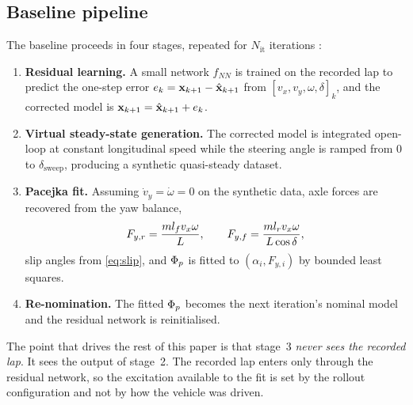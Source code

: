 \subsection{Baseline pipeline}
\label{subsec:baseline}

The baseline proceeds in four stages, repeated for $N_{\mathrm{it}}$
iterations \cite{ontrack2025}:

\begin{enumerate}
\item \textbf{Residual learning.} A small network $f_{NN}$ is trained on the
recorded lap to predict the one-step error $e_{k}=\mathbf{x}_{k+1}-\hat{\mathbf{x}}_{k+1}$
from $[v_{x},v_{y},\omega,\delta]_{k}$, and the corrected model is
$\mathbf{x}_{k+1}=\hat{\mathbf{x}}_{k+1}+e_{k}$.
\item \textbf{Virtual steady-state generation.} The corrected model is
integrated open-loop at constant longitudinal speed while the steering angle is
ramped from $0$ to $\delta_{\mathrm{sweep}}$, producing a synthetic
quasi-steady dataset.
\item \textbf{Pacejka fit.} Assuming $\dot v_{y}=\dot\omega=0$ on the synthetic
data, axle forces are recovered from the yaw balance,
\begin{equation}
F_{y,r}=\frac{m l_{f}v_{x}\omega}{L},\qquad
F_{y,f}=\frac{m l_{r} v_{x}\omega}{L\cos\delta},
\label{eq:ssforces}
\end{equation}
slip angles from \eqref{eq:slip}, and $\Phi_{p}$ is fitted to
$(\alpha_{i},F_{y,i})$ by bounded least squares.
\item \textbf{Re-nomination.} The fitted $\Phi_{p}$ becomes the next iteration's
nominal model and the residual network is reinitialised.
\end{enumerate}

The point that drives the rest of this paper is that stage~3 \emph{never sees
the recorded lap}. It sees the output of stage~2. The recorded lap enters only
through the residual network, so the excitation available to the fit is set by
the rollout configuration and not by how the vehicle was driven.
